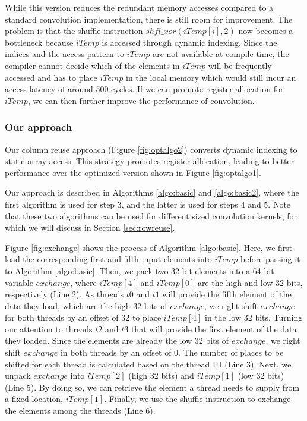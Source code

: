 While this version reduces the redundant memory accesses compared to a standard convolution implementation, there is still room for improvement.
The problem is that the shuffle instruction $shfl\_xor(iTemp[i],2)$ now becomes a bottleneck because $iTemp$ is accessed through dynamic indexing.
Since the indices and the access pattern to $iTemp$ are not available at compile-time, the compiler cannot decide which of the elements in $iTemp$ will be frequently accessed and has to place $iTemp$ in the local memory which would still incur an access latency of around 500 cycles.
If we can promote register allocation for $iTemp$, we can then further improve the performance of convolution.

\subsubsection{Our approach}
Our column reuse approach (Figure \ref {fig:optalgo2}) converts dynamic indexing to static array access.
This strategy promotes register allocation, leading to better performance over the optimized version shown in Figure \ref{fig:optalgo1}.

Our approach is described in Algorithms \ref{algo:basic} and \ref{algo:basic2}, where the first algorithm is used for step 3, and the latter is used for steps 4 and 5.
Note that these two algorithms can be used for different sized convolution kernels, for which we will discuss in Section \ref {sec:rowreuse}.

Figure \ref{fig:exchange} shows the process of Algorithm \ref{algo:basic}.
Here, we first load the corresponding first and fifth input elements into $iTemp$ before passing it to Algorithm \ref{algo:basic}.
Then, we pack two 32-bit elements into a 64-bit variable $exchange$, where $iTemp[4]$ and $iTemp[0]$ are the high and low 32 bits, respectively (Line 2).
As threads $t0$ and $t1$ will provide the fifth element of the data they load, which are the high 32 bits of $exchange$, we right shift $exchange$ for both threads by an offset of 32 to place $iTemp[4]$ in the low 32 bits.
Turning our attention to threads $t2$ and $t3$ that will provide the first element of the data they loaded.
Since the elements are already the low 32 bits of $exchange$, we right shift $exchange$ in both threads by an offset of 0.
The number of places to be shifted for each thread is calculated based on the thread ID (Line 3).
Next, we unpack $exchange$ into $iTemp[2]$ (high 32 bits) and $iTemp[1]$ (low 32 bits) (Line 5). By doing so, we can retrieve the element a thread needs to supply from a fixed location, $iTemp[1]$.
Finally, we use the shuffle instruction to exchange the elements among the threads (Line 6).

